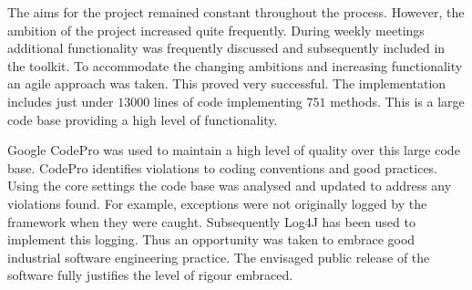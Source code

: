 The aims for the project remained constant throughout the process.
However, the ambition of the project increased quite frequently.
During weekly meetings additional functionality was frequently discussed and subsequently included in the toolkit.
To accommodate the changing ambitions and increasing functionality an agile approach was taken.
This proved very successful.
The implementation includes just under $13000$ lines of code implementing $751$ methods.
This is a large code base providing a high level of functionality.

Google CodePro\cite{codeproweb} was used to maintain a high level of quality over this large code base.
CodePro identifies violations to coding conventions and good practices.
Using the core settings the code base was analysed and updated to address any violations found.
For example, exceptions were not originally logged by the framework when they were caught.
Subsequently Log4J\cite{log4jweb} has been used to implement this logging.
Thus an opportunity was taken to embrace good industrial software engineering practice.
The envisaged public release of the software fully justifies the level of rigour embraced.


